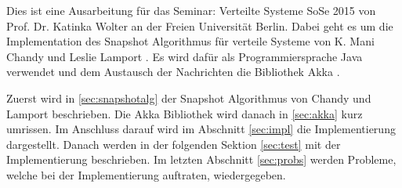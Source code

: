 Dies ist eine Ausarbeitung für das Seminar: Verteilte Systeme SoSe 2015 von Prof. Dr. Katinka Wolter an der Freien Universität Berlin.
Dabei geht es um die Implementation des Snapshot Algorithmus für verteile Systeme von K. Mani Chandy und Leslie Lamport \cite{snapshotChandyLamport}.
Es wird dafür als Programmiersprache Java \cite{java} verwendet und dem Austausch der Nachrichten die Bibliothek Akka \cite{akka}.

Zuerst wird in \ref{sec:snapshotalg} der Snapshot Algorithmus von Chandy und Lamport beschrieben.
Die Akka Bibliothek wird danach in \ref{sec:akka} kurz umrissen.
Im Anschluss darauf wird im Abschnitt \ref{sec:impl} die Implementierung dargestellt.
Danach werden in der folgenden Sektion \ref{sec:test} mit der Implementierung beschrieben.
Im letzten Abschnitt \ref{sec:probs} werden Probleme, welche bei der Implementierung auftraten, wiedergegeben.